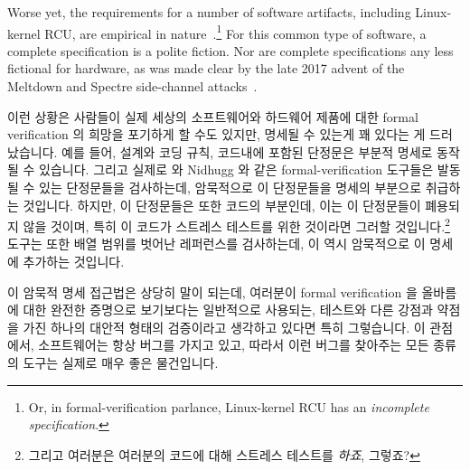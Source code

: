 Worse yet, the requirements for a number of software artifacts,
including Linux-kernel RCU, are empirical in
nature~\cite{PaulEMcKenney2015RCUreqts1,PaulEMcKenney2015RCUreqts2,PaulEMcKenney2015RCUreqts3}.\footnote{
	Or, in formal-verification parlance, Linux-kernel RCU has an
	\emph{incomplete specification}.}
For this common type of software, a complete specification is a
polite fiction.
Nor are complete specifications any less fictional for hardware,
as was made clear by the late 2017 advent of the Meltdown and Spectre
side-channel attacks~\cite{JannHorn2018MeltdownSpectre}.
\fi

이런 상황은 사람들이 실제 세상의 소프트웨어와 하드웨어 제품에 대한 formal
verification 의 희망을 포기하게 할 수도 있지만, 명세될 수 있는게 꽤 있다는 게
드러났습니다.
예를 들어, 설계와 코딩 규칙, 코드내에 포함된 단정문은 부분적 명세로 동작될 수
있습니다.
그리고 실제로  와 Nidhugg 와 같은 formal-verification 도구들은 발동될
수 있는 단정문들을 검사하는데, 암묵적으로 이 단정문들을 명세의 부분으로
취급하는 것입니다.
하지만, 이 단정문들은 또한 코드의 부분인데, 이는 이 단정문들이 폐용되지 않을
것이며, 특히 이 코드가 스트레스 테스트를 위한 것이라면 그러할
것입니다.\footnote{
	그리고 여러분은 여러분의 코드에 대해 스트레스 테스트를 \emph{하죠},
	그렇죠?}
 도구는 또한 배열 범위를 벗어난 레퍼런스를 검사하는데, 이 역시
암묵적으로 이 명세에 추가하는 것입니다.
\iffalse

This situation might cause one to give up all hope of formal verification
of real-world software and hardware artifacts, but it turns out that there is
quite a bit that can be done.
For example, design and coding rules can act as a partial specification,
as can assertions contained in the code.
And in fact formal-verification tools such as \co{cbmc} and Nidhugg
both check for assertions that can be triggered, implicitly treating
these assertions as part of the specification.
However, the assertions are also part of the code, which makes it less
likely that they will become obsolete, especially if the code is
also subjected to stress tests.\footnote{
	And you \emph{do} stress-test your code, don't you?}
The \co{cbmc} tool also checks for array-out-of-bound references,
thus implicitly adding them to the specification.
\fi

이 암묵적 명세 접근법은 상당히 말이 되는데, 여러분이 formal verification 을
올바름에 대한 완전한 증명으로 보기보다는 일반적으로 사용되는, 테스트와 다른
강점과 약점을 가진 하나의 대안적 형태의 검증이라고 생각하고 있다면 특히
그렇습니다.
이 관점에서, 소프트웨어는 항상 버그를 가지고 있고, 따라서 이런 버그를 찾아주는
모든 종류의 도구는 실제로 매우 좋은 물건입니다.
\iffalse

